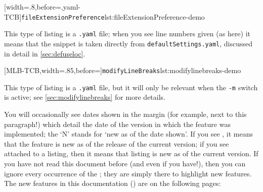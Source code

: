 	\begin{minipage}{.4\textwidth}
		[width=.8\linewidth,before=\centering,yaml-TCB]{\texttt{fileExtensionPreference}}{lst:fileExtensionPreference-demo}
	\end{minipage}%
	\hfill
	\begin{minipage}{.4\textwidth}
		This type of listing is a \texttt{.yaml} file; when you see line numbers given (as here)
		it means that the snippet is taken directly from \texttt{defaultSettings.yaml}, discussed in
		detail in \vref{sec:defuseloc}.
	\end{minipage}%

	\begin{minipage}{.55\textwidth}
		[MLB-TCB,width=.85\linewidth,before=\centering]{\texttt{modifyLineBreaks}}{lst:modifylinebreaks-demo}
	\end{minipage}%
	\hfill
	\begin{minipage}{.4\textwidth}
		This type of listing is a \texttt{.yaml} file, but it will only
		be relevant when the \texttt{-m} switch is active; see \vref{sec:modifylinebreaks}
		for more details.
	\end{minipage}%

	You will occasionally see dates shown in the margin (for example, next to this paragraph!)
	 which detail the date of the version in which the feature was implemented;
	the `N' stands for `new as of the date shown'. If you see \stardemo, it
	means that the feature is new as of the release of the current version; if you see \stardemo\,
	attached to a listing, then it means that listing is new as of the current version. If you have
	not read this document before (and even if you have!), then you can ignore every occurrence of the \stardemo;
	they are simply there to highlight new features.
	The new features in this documentation (\gitRel) are on the following pages: \listOfNewFeatures
